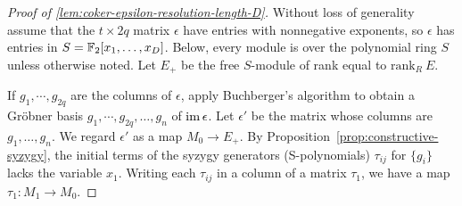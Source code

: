 \begin{proof}[Proof of \ref{lem:coker-epsilon-resolution-length-D}]
Without loss of generality
assume that the $t \times 2q$ matrix $\epsilon$ have entries with nonnegative exponents,
so $\epsilon$ has entries in $S=\mathbb{F}_2[x_1,\ldots,x_D]$.
Below, every module is over the polynomial ring $S$ unless otherwise noted.
Let $E_+$ be the free $S$-module of rank equal to $\mathrm{rank}_R~ E$.

If $g_1,\cdots, g_{2q}$ are the columns of $\epsilon$,
apply Buchberger's algorithm to obtain a Gr\"obner basis
$g_1,\cdots, g_{2q}, \ldots, g_n$ of $\mathop{\mathrm{im}}\nolimits \epsilon$.
Let $\epsilon'$ be the matrix whose columns are $g_1,\ldots, g_n$.
We regard $\epsilon'$ as a map $M_0 \to E_+$.
By Proposition~\ref{prop:constructive-syzygy},
the initial terms of the syzygy generators (S-polynomials) 
$\tau_{ij}$ for $\{ g_i \}$ lacks the variable $x_1$.
Writing each $\tau_{ij}$ in a column of a matrix $\tau_1$, we have a map $\tau_1 : M_1 \to M_0$.


\end{proof}
